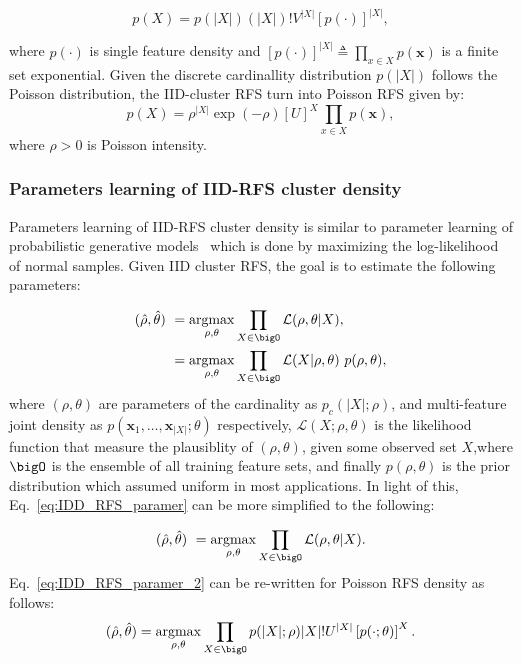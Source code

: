 \documentclass[journal]{IEEEtran}
\newcommand \argmax {\operatorname*{argmax}}
\begin{document}
\begin{equation}
p(X)=p(|X|)(|X|)!V^{|X|}[p(\cdot)]^{|X|},
\end{equation}

where $p(\cdot)$ is single feature density and $[p(\cdot)]^{|X|} \triangleq \prod _{x\in X} p(\mathbf{x})$ is a finite set exponential. Given the discrete cardinallity distribution $p(|X|)$ follows the Poisson distribution, the IID-cluster RFS turn into Poisson RFS given by:
\begin{equation}
p(X)=\rho^{|X|} \exp{(-\rho)}\left[U\right] ^X \prod _{x\in X} p(\mathbf{x}),
\label{eq:poisson}
\end{equation}
where $\rho >0$ is Poisson intensity.
\subsubsection{Parameters learning of IID-RFS cluster density}
\label{sec:IDD_RFS_learning}
Parameters learning of IID-RFS cluster density is similar to parameter learning of probabilistic generative models~\cite{goodfellow2016deep} which is done by maximizing the log-likelihood of normal samples. Given IID cluster RFS, the goal is to estimate the following parameters:

\begin{equation}
\begin{split}
(\hat{\rho},\hat{\theta})~& = \argmax_{\rho,\theta} \prod_{X\in {\bigO}}\mathcal{L}(\rho,\theta|X), \\
& = \argmax_{\rho,\theta} \prod_{X\in {\bigO}}\mathcal{L}(X|\rho,\theta)~p(\rho,\theta),
\end{split}
\label{eq:IDD_RFS_paramer}
\end{equation}
where $(\rho,\theta)$ are parameters of the cardinality as $p_c(|X|;\rho)$, and multi-feature joint density as $p(\mathbf{x}_1,\ldots,\mathbf{x}_{|X|};\theta)$ respectively,  $\mathcal{L}(X;\rho,\theta)$ is the likelihood function that measure the plausiblity of $(\rho,\theta)$, given some observed set $X$,where ${\bigO}$ is the ensemble of all training feature sets,  and finally $p(\rho,\theta)$ is the prior distribution which assumed uniform in most applications. In light of this, Eq.~\ref{eq:IDD_RFS_paramer} can be more simplified to the following:

\begin{equation}
\begin{split}
(\hat{\rho},\hat{\theta})~& = \argmax_{\rho,\theta} \prod_{X\in {\bigO}}\mathcal{L}(\rho,\theta|X).\\
\end{split}
\label{eq:IDD_RFS_paramer_2}
\end{equation}
Eq.~\ref{eq:IDD_RFS_paramer_2} can be re-written for Poisson RFS density as follows:
\begin{equation}
(\hat{\rho},\hat{\theta}) = \argmax_{\rho,\theta} \prod_{X\in\bigO} p(|X|;\rho) |X|! U^{|X|}\left[p(\cdot;\theta)\right]^{X}.
\end{equation}
\end{document}
